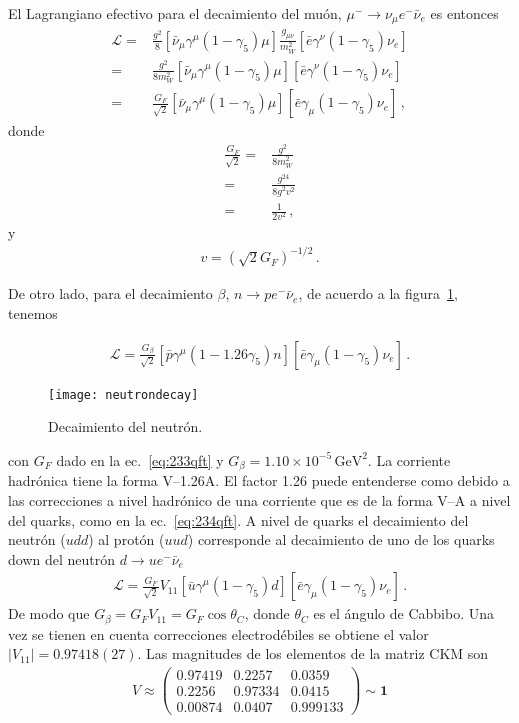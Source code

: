 El Lagrangiano efectivo para el decaimiento del muón, $\mu^-\to \nu_\mu e^- \bar{\nu}_e$ es entonces
\begin{align}
  \mathcal{L}=&\frac{g^2}{8}\left[\bar{\nu}_\mu\gamma^\mu(1-\gamma_5)\mu\right]\frac{g_{\mu\nu}}{m_W^2}
  \left[\bar{e}\gamma^\nu(1-\gamma_5)\nu_e\right]\nonumber\\
=&\frac{g^2}{8m_W^2}\left[\bar{\nu}_\mu\gamma^\mu(1-\gamma_5)\mu\right]
  \left[\bar{e}\gamma^\nu(1-\gamma_5)\nu_e\right]\nonumber\\
  =&\frac{G_F}{\sqrt{2}}\left[\bar{\nu}_\mu\gamma^\mu(1-\gamma_5)\mu\right]\left[\bar{e}\gamma_\mu(1-\gamma_5)\nu_e\right]\,,
\end{align}
donde
\begin{align}
  \frac{G_F}{\sqrt{2}}=&\frac{g^2}{8m_W^2}\nonumber\\
  =&\frac{g^24}{8g^2v^2}\nonumber\\
  =&\frac{1}{2v^2}\,,
\end{align}
y
\begin{align}
  v=\left(\sqrt{2}G_F\right)^{-1/2}\,.
\end{align}


De otro lado, para el  decaimiento $\beta$, $n\to p e^- \bar{\nu}_e$, de acuerdo a la figura~\ref{fig:neutrondecay}, tenemos

\begin{align}
    \mathcal{L}=\frac{G_\beta}{\sqrt{2}}\left[\bar{p}\gamma^\mu(1-1.26\gamma_5)n\right]\left[\bar{e}\gamma_\mu(1-\gamma_5)\nu_e\right]\,.
\end{align}
\begin{figure}
  \centering
  \texttt{[image: neutrondecay]}
  \caption{Decaimiento del neutrón.}
  \label{fig:neutrondecay}
\end{figure}
con $G_F$ dado en la ec.~\eqref{eq:233qft} y $G_\beta=1.10\times 10^{-5}\,\text{GeV}^2$. La corriente hadrónica tiene la forma V--1.26A. El factor 1.26  puede entenderse como debido a las correcciones a nivel hadrónico de una corriente que es de la forma V--A a nivel del quarks, como en la ec.~\eqref{eq:234qft}. A nivel de quarks el decaimiento del neutrón ($udd$) al protón ($uud$) corresponde al decaimiento de uno de los quarks down del neutrón $d\to u e^- \bar{\nu}_e$
\begin{align}
    \mathcal{L}=\frac{G_F}{\sqrt{2}}V_{11}\left[\bar{u}\gamma^\mu(1-\gamma_5)d\right]\left[\bar{e}\gamma_\mu(1-\gamma_5)\nu_e\right]\,.
\end{align}
De modo que $G_\beta=G_F V_{11}=G_F\cos\theta_C$, donde $\theta_C$ es el ángulo de Cabbibo. Una vez se tienen en cuenta correcciones electrodébiles se obtiene el valor $|V_{11}|=0.97418(27)$\cite{PDG}. Las magnitudes de los elementos de la matriz CKM son\cite{PDG}
\begin{align}
  V\approx\begin{pmatrix}
    0.97419&0.2257&0.0359\\
    0.2256&0.97334&0.0415\\
    0.00874&0.0407&0.999133
  \end{pmatrix}\sim \mathbf{1}
\end{align}



